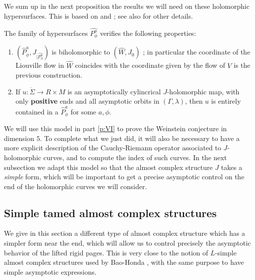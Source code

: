 \documentclass[../main.tex]{subfiles}
\begin{document}
We sum up in the next proposition the results we will need on these holomorphic hypersurfaces. This is based on \cite{roux_cas_nodate} and \cite{moreno_holomorphic_2019} ; see also \cite{dugast_sutured_2026} for other details.

\begin{proposition}\label{prop: properties_hypersurfaces}
The family of hypersurfaces $\hat{P_\phi^a}$ verifies the following properties:

\begin{enumerate}
    \item $(\hat{P}_\phi^a,J_{|\hat{P_\phi^a}})$ is biholomorphic to $(\widehat{W},J_0)$ ; in particular the coordinate of the Liouville flow in $\widehat{W}$ coincides with the coordinate given by the flow of $V$ is the previous construction.
    \item If $u : \dot \Sigma \rightarrow R\times M$ is an asymptotically cylincrical $J$-holomorphic map, with only \textbf{positive} ends and all asymptotic orbits in $(\Gamma, \lambda)$, then $u$ is entirely contained in a $\hat{P}_\phi^a$ for some $a,\phi$.
\end{enumerate}
    
\end{proposition}

We will use this model in part \ref{p:VI} to prove the Weinstein conjecture in dimension $5$. To complete what we just did, it will also be necessary to have a more explicit description of the Cauchy-Riemann operator associated to $J$-holomorphic curves, and to compute the index of such curves. In the next subsection we adapt this model so that the almost complex structure $J$ takes a \textit{simple} form, which will be important to get a precise asymptotic control on the end of the holomorphic curves we will consider.

\subsection{Simple tamed almost complex structures}\label{subp:simple_acs}

We give in this section a different type of almost complex structure which has a simpler form near the end, which will allow us to control precisely the asymptotic behavior of the lifted rigid pages. This is very close to the notion of $L$-simple almost complex structures used by Bao-Honda \cite{bao_definition_2018},\cite{bao_semi-global_2023} with the same purpose to have simple asymptotic expressions. \\
\end{document}
